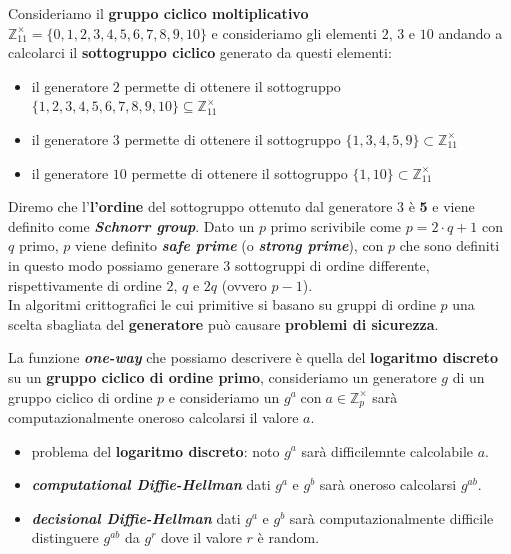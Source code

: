 \begin{flushleft}
    Consideriamo il \textbf{gruppo ciclico moltiplicativo} $\mathbb{Z}_{11}^{\times} = \{0, 1, 2, 3, 4, 5, 6, 7, 8, 9, 10\}$ e consideriamo gli elementi $2$, $3$ e $10$ andando a calcolarci il \textbf{sottogruppo ciclico} generato da questi elementi:
    \begin{itemize}[nosep]
        \item il generatore $2$ permette di ottenere il sottogruppo $\{1, 2, 3, 4, 5, 6, 7, 8, 9, 10\} \subseteq \mathbb{Z}_{11}^{\times}$
        \item il generatore $3$ permette di ottenere il sottogruppo $\{1, 3, 4, 5, 9\} \subset \mathbb{Z}_{11}^{\times}$
        \item il generatore $10$ permette di ottenere il sottogruppo $\{1, 10\} \subset \mathbb{Z}_{11}^{\times}$
    \end{itemize}
    Diremo che l'\textbf{l'ordine} del sottogruppo ottenuto dal generatore $3$ è \textbf{5} e viene definito come \textbf{\textit{Schnorr group}}. Dato un $p$ primo scrivibile come $p = 2 \cdot q + 1$ con $q$ primo, $p$ viene definito \textbf{\textit{safe prime}} (o \textbf{\textit{strong prime}}), con $p$ che sono definiti in questo modo possiamo generare 3 sottogruppi di ordine differente, rispettivamente di ordine $2$, $q$ e $2q$ (ovvero $p-1$). \\
    In algoritmi crittografici le cui primitive si basano su gruppi di ordine $p$ una scelta sbagliata del \textbf{generatore} può causare \textbf{problemi di sicurezza}.

    \smallskip

    La funzione \textbf{\textit{one-way}} che possiamo descrivere è quella del \textbf{logaritmo discreto} su un \textbf{gruppo ciclico di ordine primo}, consideriamo un generatore $g$ di un gruppo ciclico di ordine $p$ e consideriamo un $g^a \; \text{con} \; a \in \mathbb{Z}_p^{\times}$ sarà computazionalmente oneroso calcolarsi il valore $a$.

    \begin{itemize}[nosep]
        \item problema del \textbf{logaritmo discreto}: noto $g^a$ sarà difficilemnte calcolabile $a$.
        \item \textbf{\textit{computational Diffie-Hellman}} dati $g^a$ e $g^b$ sarà oneroso calcolarsi $g^{ab}$.
        \item \textbf{\textit{decisional Diffie-Hellman}} dati $g^a$ e $g^b$ sarà computazionalmente difficile distinguere $g^{ab}$ da $g^r$ dove il valore $r$ è random.
    \end{itemize}


\end{flushleft}
